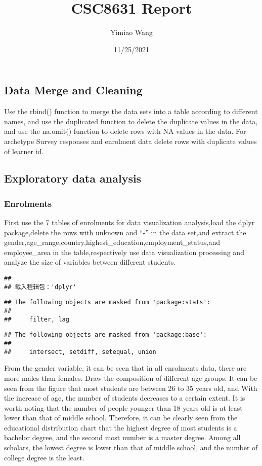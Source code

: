 \documentclass[
]{article}
\title{CSC8631 Report}
\author{Yimiao Wang}
\date{11/25/2021}
\begin{document}
\maketitle

\hypertarget{data-merge-and-cleaning}{%
\subsection{Data Merge and Cleaning}\label{data-merge-and-cleaning}}

Use the rbind() function to merge the data sets into a table according
to different names, and use the duplicated function to delete the
duplicate values in the data, and use the na.omit() function to delete
rows with NA values in the data. For archetype Survey responses and
enrolment data delete rows with duplicate values of learner id.

\hypertarget{exploratory-data-analysis}{%
\subsection{Exploratory data analysis}\label{exploratory-data-analysis}}

\hypertarget{enrolments}{%
\subsubsection{Enrolments}\label{enrolments}}

First use the 7 tables of enrolments for data visualization
analysis,load the dplyr package,delete the rows with unknown and ``-''
in the data set,and extract the
gender,age\_range,country,highest\_education,employment\_status,and
employee\_area in the table,respectively use data visualization
processing and analyze the size of variables between different students.

\begin{verbatim}
## 
## 载入程辑包：'dplyr'
\end{verbatim}

\begin{verbatim}
## The following objects are masked from 'package:stats':
## 
##     filter, lag
\end{verbatim}

\begin{verbatim}
## The following objects are masked from 'package:base':
## 
##     intersect, setdiff, setequal, union
\end{verbatim}

From the gender variable, it can be seen that in all enrolments data,
there are more males than females. Draw the composition of different age
groups. It can be seen from the figure that most students are between 26
to 35 years old, and With the increase of age, the number of students
decreases to a certain extent. It is worth noting that the number of
people younger than 18 years old is at least lower than that of middle
school. Therefore, it can be clearly seen from the educational
distribution chart that the highest degree of most students is a
bachelor degree, and the second most number is a master degree. Among
all scholars, the lowest degree is lower than that of middle school, and
the number of college degree is the least.
\end{document}
